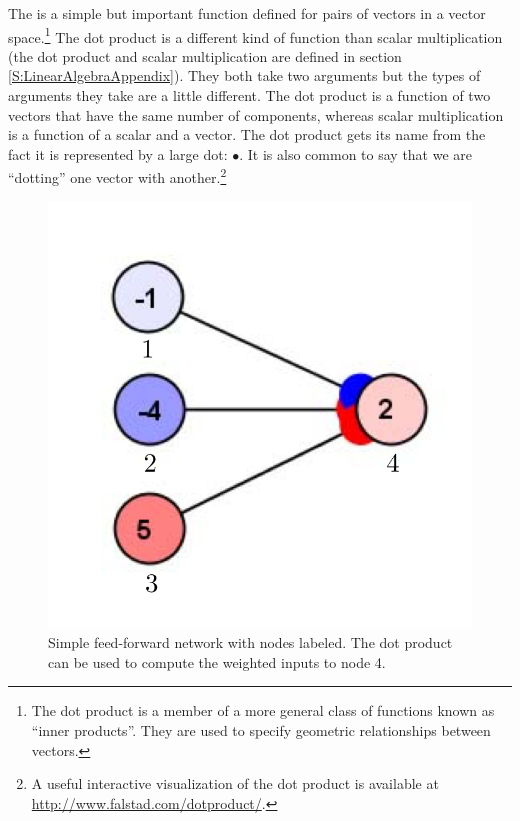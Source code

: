 
   The  is a simple but important function defined for 
pairs of vectors in a vector space.\footnote{The dot product is a member 
of a more general class of functions known as ``inner products''.  They are 
used to specify geometric relationships between vectors.}  The dot product is a 
different kind of function than scalar multiplication (the dot product and 
scalar multiplication are defined in section \ref{S:LinearAlgebraAppendix}).  
They both take two arguments but the types of arguments they take are a little 
different.  The dot product is a function of two vectors that have the same 
number of components, whereas scalar multiplication is a function of a scalar 
and a vector.  The dot product gets its name from the fact it is represented by 
a large dot: $\bullet$.  It is also common to say that we are ``dotting'' one 
vector with another.\footnote{A useful interactive visualization of the dot 
product is available at \url{http://www.falstad.com/dotproduct/}.}
\begin{figure}[h]
\centering
\includegraphics[scale=.7]{./images/Simple3Labelled.png}
\caption[Simbrain screenshot.]{Simple feed-forward network with nodes labeled. 
The dot product can be used to compute the weighted inputs to node 4.} 
\label{F:simplelabelled}
\end{figure}

